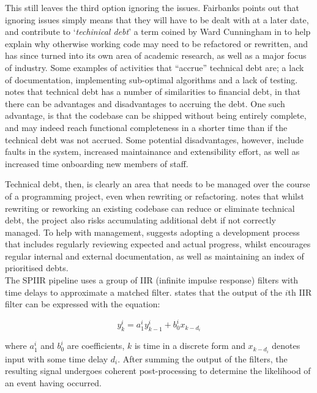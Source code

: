 \documentclass{article}
\begin{document}
This still leaves the third option \textendash{} ignoring the issues. Fairbanks points out that
ignoring issues simply means that they will have to be dealt with at a later date, and contribute to
`\textit{techinical debt}' \textendash{} a term coined by Ward Cunningham in \cite{Cunningham} to
help explain why otherwise working code may need to be refactored or rewritten, and has since turned
into its own area of academic research, as well as a major focus of industry. Some examples of
activities that ``accrue'' technical debt are; a lack of documentation, implementing sub-optimal
algorithms and a lack of testing. \cite{Allman} notes that technical debt has a number of
similarities to financial debt, in that there can be advantages and disadvantages to accruing the
debt. One such advantage, is that the codebase can be shipped without being entirely complete, and
may indeed reach functional completeness in a shorter time than if the technical debt was not
accrued. Some potential disadvantages, however, include faults in the system, increased maintainance
and extensibility effort, as well as increased time onboarding new members of staff.

Technical debt, then, is clearly an area that needs to be managed over the course of a programming
project, even when rewriting or refactoring. \cite{Fairley} notes that whilst rewriting or reworking
an existing codebase can reduce or eliminate technical debt, the project also risks accumulating
additional debt if not correctly managed. To help with management, \cite{Fairley} suggests adopting
a development process that includes regularly reviewing expected and actual progress, whilst
\cite{Allman} encourages regular internal and external documentation, as well as maintaining an
index of prioritised debts.
\\

The SPIIR pipeline uses a group of IIR (infinite impulse response) filters with time delays to
approximate a matched filter. \cite{SPIIRGPU2018} states that the output of the \(i\)th IIR filter
can be expressed with the equation:

\begin{equation}
    y^i_k = a^i_1y^i_{k-1} + b^i_0x_{k-d_i}
\end{equation}

where \(a^i_1\) and \(b^i_0\) are coefficients, \(k\) is time in a discrete form and \(x_{k-d_i}\)
denotes input with some time delay \(d_i\). After summing the output of the filters, the resulting
signal undergoes coherent post-processing to determine the likelihood of an event having occurred.
\end{document}
